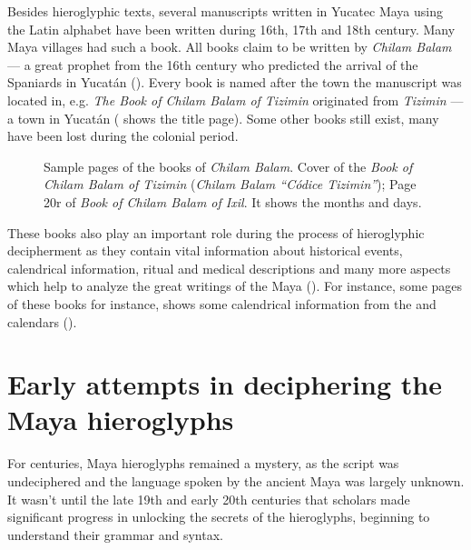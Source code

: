 \documentclass[../main.tex]{subfiles}
\begin{document}
Besides hieroglyphic texts, several manuscripts written in Yucatec Maya using the Latin alphabet 
have been written  during 16th, 17th and 18th century.
Many Maya villages had such a book.
All books claim to be written by \emph{Chilam Balam} --- a great prophet from the 16th century
who predicted the arrival of the Spaniards in Yucat\'{a}n
().
Every book is named after the town the manuscript was located in, e.g. 
\emph{The Book of Chilam Balam of Tizimin} originated from \emph{Tizimin} --- a town 
in Yucat\'{a}n
( shows the title page).
Some other books still exist, many have been lost during the colonial period.
\begin{figure}[ht]
    \centering
    \hfill
    \caption[Sample pages of the books of \emph{Chilam Balam}]{Sample pages of the books of 
             \emph{Chilam Balam}.
              Cover of the 
             \emph{Book of Chilam Balam of Tizimin} (\emph{Chilam Balam ``C\'odice Tizimin''});
              Page 20r of 
             \emph{Book of Chilam Balam of Ixil}. It shows the \haab months and \tzolkin days.}
\end{figure}
These books also play an important role during the process of hieroglyphic decipherment as they 
contain vital information about historical events, calendrical information, ritual and 
medical descriptions and many more aspects which help to analyze the great writings of the 
Maya (\cite[3\psq]{roys1933}).
For instance, some pages of these books for instance, shows some 
calendrical information from the \tzolkin and \haab calendars 
().

\section{Early attempts in deciphering the Maya hieroglyphs}
For centuries, Maya hieroglyphs remained a mystery, as the script was undeciphered and the language 
spoken by the ancient Maya was largely unknown. 
It wasn’t until the late 19th and early 20th centuries that scholars made significant progress in 
unlocking the secrets of the hieroglyphs, beginning to understand their grammar and syntax.
\end{document}

